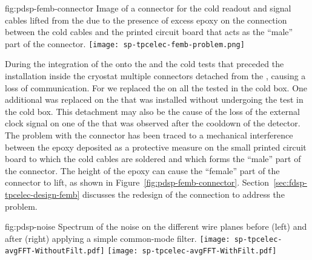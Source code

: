 \begin{dunefigure}
{fig:pdsp-femb-connector}
{Image of a connector for the cold readout and signal cables lifted from
the  due to the presence of excess epoxy on the 
connection between the cold cables and the printed circuit board
that acts as the ``male'' part of the connector.}
\texttt{[image: sp-tpcelec-femb-problem.png]}
\end{dunefigure}

\begin{comment}During the integration of the \dwords{femb} onto the \dwords{apa}
and the cold tests that preceded the \dwords{apa} installation
inside the \dword{pdsp} cryostat a problem occurred %
on the 
connection between the cold readout and control cables and the
\dwords{femb}. In multiple cases the connector %
detached from
the \dword{femb} causing a loss of communication. 
\end{comment}
During the integration of the  onto the 
and the cold tests that preceded the  installation
inside the  cryostat multiple connectors  
detached from
the , causing a loss of communication.  
For  we replaced the  %
on all the  tested in the cold box. %
One additional  was 
replaced on the  that was installed without undergoing 
the test in the cold box. This %
detachment may also be the cause
of the loss of the external clock signal on one of the 
that was observed after the cooldown of the detector. 
%
The problem 
with the connector has been traced to a mechanical interference between 
the epoxy deposited as a protective measure on the small printed circuit
board to which the cold cables are soldered and which forms the
``male'' part of the connector. The height of the epoxy can cause
the ``female'' part of the connector to lift, %
as shown in 
Figure~\ref{fig:pdsp-femb-connector}. %
Section~\ref{sec:fdsp-tpcelec-design-femb} discusses the redesign of the connection to address the problem.

\begin{dunefigure}
{fig:pdsp-noise}
{Spectrum of the noise on the different   wire planes before
(left) and after (right) applying a simple common-mode filter.}
\texttt{[image: sp-tpcelec-avgFFT-WithoutFilt.pdf]}
\texttt{[image: sp-tpcelec-avgFFT-WithFilt.pdf]}
\end{dunefigure}

